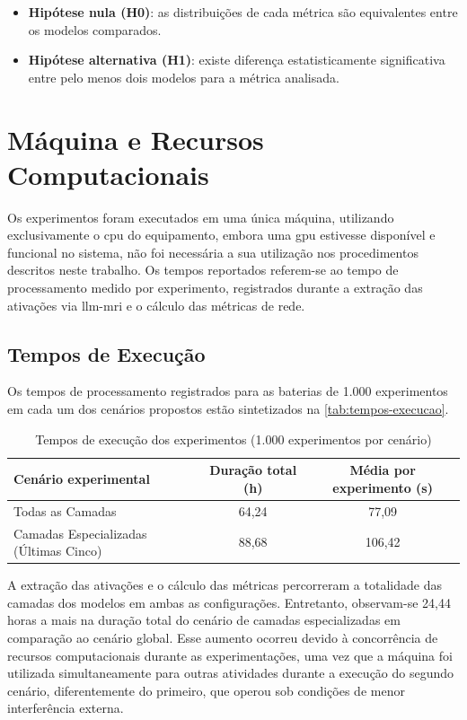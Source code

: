 \begin{itemize}
\item \textbf{Hipótese nula (H0)}: as distribuições de cada métrica são equivalentes entre os modelos comparados.
\item \textbf{Hipótese alternativa (H1)}: existe diferença estatisticamente significativa entre pelo menos dois modelos para a métrica analisada.
\end{itemize}


\section{Máquina e Recursos Computacionais}
\label{sec:ambiente-maquina}

Os experimentos foram executados em uma única máquina, utilizando exclusivamente o \gls{cpu} do equipamento, embora uma \gls{gpu} estivesse disponível e funcional no sistema, não foi necessária a sua utilização nos procedimentos descritos neste trabalho. Os tempos reportados referem-se ao tempo de processamento medido por experimento, registrados durante a extração das ativações via \gls{llm-mri} e o cálculo das métricas de rede.

\subsection{Tempos de Execução}

Os tempos de processamento registrados para as baterias de 1.000 experimentos em cada um dos cenários propostos estão sintetizados na \autoref{tab:tempos-execucao}.

\begin{table}[h!]
    \centering
    \caption{Tempos de execução dos experimentos (1.000 experimentos por cenário)}
    \label{tab:tempos-execucao}
    \begin{tabular}{|l|c|c|}
        \hline
        \textbf{Cenário experimental} & \textbf{Duração total (h)} & \textbf{Média por experimento (s)} \\
        \hline
        Todas as Camadas & 64,24 & 77,09 \\
        Camadas Especializadas (Últimas Cinco) & 88,68 & 106,42 \\
        \hline
    \end{tabular}
    \fonte{}
\end{table}

A extração das ativações e o cálculo das métricas percorreram a totalidade das camadas dos modelos em ambas as configurações. Entretanto, observam-se 24,44 horas a mais na duração total do cenário de camadas especializadas em comparação ao cenário global. Esse aumento ocorreu devido à concorrência de recursos computacionais durante as experimentações, uma vez que a máquina foi utilizada simultaneamente para outras atividades durante a execução do segundo cenário, diferentemente do primeiro, que operou sob condições de menor interferência externa.

